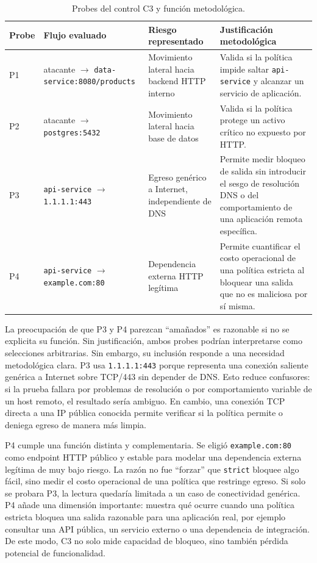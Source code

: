 \begin{table}[htbp]
\centering
\small
\caption{Probes del control C3 y función metodológica.}
\label{tab:c3-probes-justificacion}
\begin{tabular}{p{0.9cm}p{4.2cm}p{4.5cm}p{4.0cm}}
\toprule
Probe & Flujo evaluado & Riesgo representado & Justificación metodológica \\
\midrule
P1 & atacante $\rightarrow$ \texttt{data-service:8080/products} & Movimiento lateral hacia backend HTTP interno & Valida si la política impide saltar \texttt{api-service} y alcanzar un servicio de aplicación. \\
P2 & atacante $\rightarrow$ \texttt{postgres:5432} & Movimiento lateral hacia base de datos & Valida si la política protege un activo crítico no expuesto por HTTP. \\
P3 & \texttt{api-service} $\rightarrow$ \texttt{1.1.1.1:443} & Egreso genérico a Internet, independiente de DNS & Permite medir bloqueo de salida sin introducir el sesgo de resolución DNS o del comportamiento de una aplicación remota específica. \\
P4 & \texttt{api-service} $\rightarrow$ \texttt{example.com:80} & Dependencia externa HTTP legítima & Permite cuantificar el costo operacional de una política estricta al bloquear una salida que no es maliciosa por sí misma. \\
\bottomrule
\end{tabular}
\end{table}

La preocupación de que P3 y P4 parezcan ``amañados'' es razonable si no se explicita su función. Sin justificación, ambos probes podrían interpretarse como selecciones arbitrarias. Sin embargo, su inclusión responde a una necesidad metodológica clara. P3 usa \texttt{1.1.1.1:443} porque representa una conexión saliente genérica a Internet sobre TCP/443 sin depender de DNS. Esto reduce confusores: si la prueba fallara por problemas de resolución o por comportamiento variable de un host remoto, el resultado sería ambiguo. En cambio, una conexión TCP directa a una IP pública conocida permite verificar si la política permite o deniega egreso de manera más limpia.

P4 cumple una función distinta y complementaria. Se eligió \texttt{example.com:80} como endpoint HTTP público y estable para modelar una dependencia externa legítima de muy bajo riesgo. La razón no fue ``forzar'' que \texttt{strict} bloquee algo fácil, sino medir el costo operacional de una política que restringe egreso. Si solo se probara P3, la lectura quedaría limitada a un caso de conectividad genérica. P4 añade una dimensión importante: muestra qué ocurre cuando una política estricta bloquea una salida razonable para una aplicación real, por ejemplo consultar una API pública, un servicio externo o una dependencia de integración. De este modo, C3 no solo mide capacidad de bloqueo, sino también pérdida potencial de funcionalidad.

